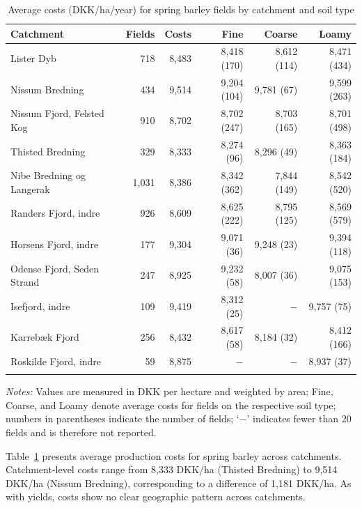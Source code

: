 \documentclass[12pt]{article}
\begin{document}
\begin{table}[H]
\centering
\small
\caption{Average costs (DKK/ha/year) for spring barley fields by catchment and soil type}
\label{tab:costs-vaarbyg}
\begin{threeparttable}
\begin{tabular}{lrrrrr}
\toprule
\textbf{Catchment} & \textbf{Fields} & \textbf{Costs} &
\textbf{Fine} & \textbf{Coarse} & \textbf{Loamy} \\
\midrule\addlinespace
Lister Dyb                 & 718 & 8,483 & 8,418 (170) & 8,612 (114) & 8,471 (434) \\
Nissum Bredning            & 434 & 9,514 & 9,204 (104) & 9,781 (67)  & 9,599 (263) \\
Nissum Fjord, Felsted Kog  & 910 & 8,702 & 8,702 (247) & 8,703 (165) & 8,701 (498) \\
Thisted Bredning           & 329 & 8,333 & 8,274 (96)  & 8,296 (49)  & 8,363 (184) \\
Nibe Bredning og Langerak  & 1,031 & 8,386 & 8,342 (362) & 7,844 (149) & 8,542 (520) \\
Randers Fjord, indre       & 926 & 8,609 & 8,625 (222) & 8,795 (125) & 8,569 (579) \\
Horsens Fjord, indre       & 177 & 9,304 & 9,071 (36)  & 9,248 (23)  & 9,394 (118) \\
Odense Fjord, Seden Strand & 247 & 8,925 & 9,232 (58)  & 8,007 (36)  & 9,075 (153) \\
Isefjord, indre            & 109 & 9,419 & 8,312 (25)  & $-$          & 9,757 (75) \\
Karrebæk Fjord             & 256 & 8,432 & 8,617 (58)  & 8,184 (32)  & 8,412 (166) \\
Roskilde Fjord, indre      & 59  & 8,875 & $-$          & $-$          & 8,937 (37) \\
\addlinespace\bottomrule
\end{tabular}
\begin{tablenotes}
\footnotesize
\item \textit{Notes:} Values are measured in DKK per hectare and weighted by area;
Fine, Coarse, and Loamy denote average costs for fields on the respective soil type;
numbers in parentheses indicate the number of fields; `$-$' indicates fewer than 20 fields and is therefore not reported.
\end{tablenotes}
\end{threeparttable}
\end{table}


Table~\ref{tab:costs-vaarbyg} presents average production costs for spring barley across catchments. Catchment-level costs range from 8,333 DKK/ha (Thisted Bredning) to 9,514 DKK/ha (Nissum Bredning), corresponding to a difference of 1,181 DKK/ha. As with yields, costs show no clear geographic pattern across catchments.
\end{document}
